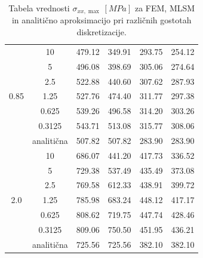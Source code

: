 \documentclass[12pt,a4paper,twoside]{article}
\theoremstyle{definition} %
\theoremstyle{plain} %
\numberwithin{equation}{section}
\newcommand{\ts}{\sigma}
\begin{document}
\begin{table}[h]
\begin{tabular}{ccllll}
                              & 10                 & 479.12                   & 349.91                  & 293.75                   & 254.12                  \\
                              & 5                  & 496.08                   & 398.69                  & 305.06                   & 274.64                  \\
                              & 2.5                & 522.88                   & 440.60                  & 307.62                   & 287.93                  \\
    0.85                      & 1.25               & 527.76                   & 474.40                  & 311.77                   & 297.38                  \\
                              & 0.625              & 539.26                   & 496.58                  & 314.20                   & 303.26                  \\
                              & 0.3125             & 543.71                   & 513.08                  & 315.77                   & 308.06                  \\ \cline{2-6}
                              & analitična         & 507.82                   & 507.82                  & 283.90                   & 283.90                  \\ \hline
                              & 10                 & 686.07                   & 441.20                  & 417.73                   & 336.52                  \\
                              & 5                  & 729.38                   & 537.49                  & 435.49                   & 373.08                  \\
                              & 2.5                & 769.58                   & 612.33                  & 438.91                   & 399.72                  \\
    2.0                       & 1.25               & 785.98                   & 683.24                  & 448.12                   & 417.17                  \\
                              & 0.625              & 808.62                   & 719.75                  & 447.74                   & 428.46                  \\
                              & 0.3125             & 809.06                   & 750.50                  & 451.95                   & 436.21                  \\ \cline{2-6}
                              & analitična         & 725.56                   & 725.56                  & 382.10                   & 382.10                  \\ \hline
  \end{tabular}
  \caption{Tabela vrednosti $\ts_{xx, \max}\ [\unit{MPa}]$ za FEM, MLSM in analitično aproksimacijo pri različnih gostotah diskretizacije.}
  \label{tab:sxxmax}
\end{table}
\end{document}
